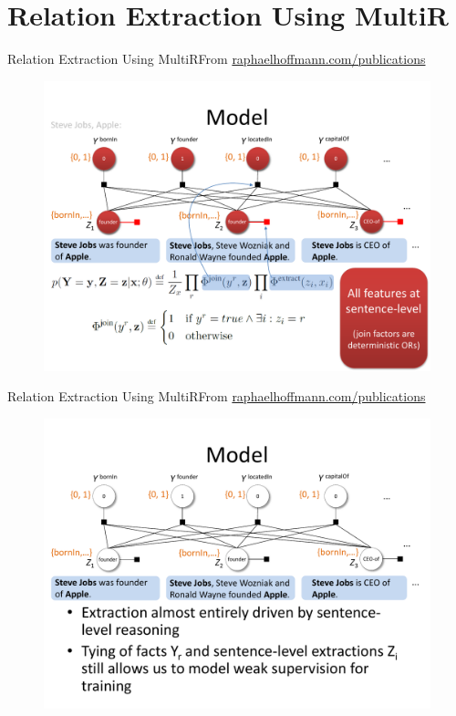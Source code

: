 \documentclass{beamer}
\begin{document}
\section{Relation Extraction Using MultiR}
\begin{frame}{Relation Extraction Using MultiR}{From \url{raphaelhoffmann.com/publications}}
\begin{figure}[h]
 \centering
 \includegraphics[scale=0.40]{./imgs/multirmode1.pdf}
 \end{figure}
\end{frame}
\begin{frame}{Relation Extraction Using MultiR}{From \url{raphaelhoffmann.com/publications}}
\begin{figure}[h]
 \centering
 \includegraphics[scale=0.40]{./imgs/multirmode2.pdf}
 \end{figure}
\end{frame}
\end{document}

